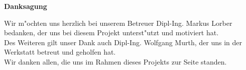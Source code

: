 \thispagestyle{empty}
\begin{center}
\Large{\textbf{Danksagung}} 
\end{center}

\hspace{1cm}

Wir m"ochten uns herzlich bei unserem Betreuer Dipl-Ing. Markus Lorber bedanken, der uns bei diesem Projekt unterst"utzt und motiviert hat.\\

Des Weiteren gilt unser Dank auch Dipl-Ing. Wolfgang Murth, der uns in der Werkstatt betreut und geholfen hat.\\   

Wir danken allen, die uns im Rahmen dieses Projekts zur Seite standen.  

\thispagestyle{empty}     
